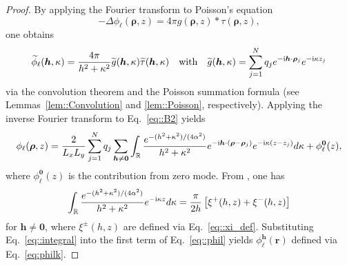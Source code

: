\begin{proof}
	By applying the Fourier transform to Poisson's equation
	\begin{equation}\label{eq::B.1}
		-\Delta\phi_{\ell}(\bm{\rho},z)=4\pi g(\bm{\rho},z)\ast\tau(\bm{\rho},z),
	\end{equation}
	one obtains  
	\begin{equation}\label{eq::B2}
		\widetilde{\phi}_{\ell}(\bm{h},\kappa)=\frac{4\pi}{h^2+\kappa^2}\widetilde{g}(\bm{h},\kappa)\widetilde{\tau}(\bm{h},\kappa)\quad\text{with}\quad \widetilde{g}(\bm{h},\kappa)=\sum_{j=1}^{N}q_{j} e^{-\mathrm{i} \bm{h}\cdot\bm{\rho}_{j}}e^{-\mathrm{i} \kappa z_{j}}
	\end{equation}
	via the convolution theorem and the Poisson summation formula (see Lemmas~\ref{lem::Convolution} and \ref{lem::Poisson}, respectively). Applying the inverse Fourier transform to Eq.~\eqref{eq::B2} yields
	\begin{equation}\label{eq::phil}
		\phi_{\ell}(\bm{\rho},z)=\frac{2}{L_xL_y}\sum_{j=1}^{N}q_{j}\sum_{\bm{h}\neq\bm{0}}\int_{\mathbb{R}}\frac{e^{-(h^2+\kappa^2)/(4\alpha^2)}}{h^2+\kappa^2}e^{-\mathrm{i} \bm{h}\cdot(\bm{\rho}-\bm{\rho}_{j})}e^{-\mathrm{i} \kappa(z-z_{j})}d\kappa + \phi^{\bm{0}}_{\ell}(z),
	\end{equation}
	where $\phi^{\bm{0}}_{\ell}(z)$ is the contribution from zero mode. From \cite{oberhettinger2012tables}, one has 
	\begin{equation}\label{eq::integral}
		\int_{\mathbb{R}} \frac{e^{-(h^2+\kappa^2)/(4\alpha^2)}}{h^2+\kappa^2} e^{-\mathrm{i} \kappa z} d\kappa = \frac{\pi}{2h} \left[\xi^{+}(h,z)+\xi^{-}(h,z)\right]
	\end{equation}
	for $\bm{h}\neq\bm{0}$, where $\xi^{\pm}(h,z)$ are defined via Eq.~\eqref{eq::xi_def}. Substituting Eq.~\eqref{eq::integral} into the first term of Eq.~\eqref{eq::phil} yields $\phi_{\ell}^{\bm{h}}(\bm{r})$ defined via Eq.~\eqref{eq:philk}.


\end{proof}
